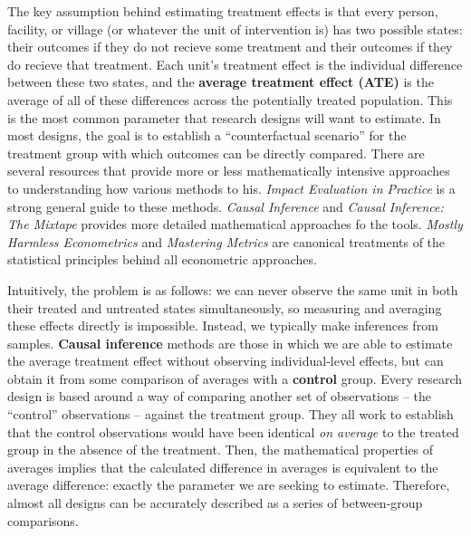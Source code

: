 The key assumption behind estimating treatment effects is that every
person, facility, or village (or whatever the unit of intervention is)
has two possible states: their outcomes if they do not recieve some treatment
and their outcomes if they do recieve that treatment.
Each unit's treatment effect is the individual difference between these two states,
and the \textbf{average treatment effect (ATE)} is the average of all of
these differences across the potentially treated population.
This is the most common parameter that research designs will want to estimate.
In most designs, the goal is to establish a ``counterfactual scenario'' for the treatment group
with which outcomes can be directly compared.
There are several resources that provide more or less mathematically intensive
approaches to understanding how various methods to his.
\textit{Impact Evaluation in Practice} is a strong general guide to these methods.
\textit{Causal Inference} and \textit{Causal Inference: The Mixtape}
provides more detailed mathematical approaches fo the tools.
\textit{Mostly Harmless Econometrics} and \textit{Mastering Metrics}
are canonical treatments of the statistical principles behind all econometric approaches.

Intuitively, the problem is as follows: we can never observe the same unit
in both their treated and untreated states simultaneously,
so measuring and averaging these effects directly is impossible.
Instead, we typically make inferences from samples.
\textbf{Causal inference} methods are those in which we are able to estimate the
average treatment effect without observing individual-level effects,
but can obtain it from some comparison of averages with a \textbf{control} group.
Every research design is based around a way of comparing another set of observations --
the ``control'' observations -- against the treatment group.
They all work to establish that the control observations would have been
identical \textit{on average} to the treated group in the absence of the treatment.
Then, the mathematical properties of averages implies that the calculated
difference in averages is equivalent to the average difference:
exactly the parameter we are seeking to estimate.
Therefore, almost all designs can be accurately described
as a series of between-group comparisons.

